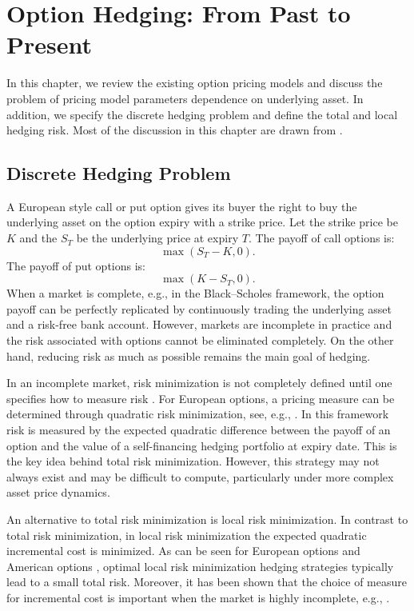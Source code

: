 \documentclass[letterpaper,12pt,titlepage,oneside,final]{book}
\numberwithin{equation}{section}
\theoremstyle{definition}
\begin{document}
\chapter{Option Hedging: From Past to Present}
\label{sec:Background} 
In this chapter, we review the existing option pricing models and discuss the problem of pricing model parameters dependence on underlying asset.  In addition, we specify the discrete hedging problem and define the total and local hedging risk. Most of the discussion in this chapter are drawn from \cite{shreve2004stochastic,heston1993closed,bartlett2006hedging,hagan2017bartlett,hagan2002managing}. 




\section{Discrete Hedging Problem}
\label{sec:DiscreteHedgingCriteria}
 A European style call or put option gives its buyer the right to buy the underlying asset on the option expiry with a strike price. Let the strike price be $K$ and  the $S_T$ be the underlying price at expiry $T$. The payoff of call options is:
\[
\max(S_T-K,0).
\]
The payoff of put options is:
\[
\max(K-S_T,0).
\]
When a market is complete, e.g., in the Black–Scholes framework, the option payoff can be perfectly replicated by continuously trading the underlying asset and a risk-free bank account. However, markets are incomplete in practice and
the risk associated with options cannot be eliminated completely. On the other hand, reducing risk as much as possible remains the main goal of hedging.

In an incomplete market, risk minimization is not completely defined until one specifies how to measure risk \cite{follmer1999quantile,follmer2000efficient,schweizerguided,el1995dynamic}. For European options, a pricing measure
can be determined through quadratic risk minimization, see, e.g., \cite{schweizer1995variance,schweizerguided,coleman2007total}. In this framework risk is measured by the expected quadratic difference between the payoff of an option and the value of a self-financing hedging portfolio at expiry date. This is the key idea behind total risk minimization. However, this strategy may not always exist and may be difficult to compute, particularly under more complex asset price dynamics\cite{coleman2003discrete,coleman2007discrete}.

An alternative to total risk minimization is local risk minimization. In contrast to total risk minimization, in local risk minimization the expected quadratic incremental cost is minimized.
As can be seen for European options \cite{coleman2003discrete} and American options \cite{coleman2007discrete} , optimal local risk minimization hedging strategies typically lead to a small total risk. Moreover, it has been shown that the choice of measure for incremental cost is important when the market is highly incomplete, e.g., \cite{coleman2003discrete,coleman2007discrete}. 
\end{document}
